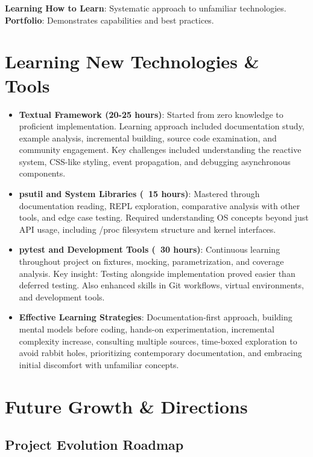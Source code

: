 \documentclass[12pt,a4paper,oneside]{report}
\begin{document}
\textbf{Learning How to Learn}: Systematic approach to unfamiliar technologies. \textbf{Portfolio}: Demonstrates capabilities and best practices.

\section{Learning New Technologies \& Tools}
\label{sec:learning-technologies}

\begin{itemize}
    \item \textbf{Textual Framework (20-25 hours)}: Started from zero knowledge to proficient implementation. Learning approach included documentation study, example analysis, incremental building, source code examination, and community engagement. Key challenges included understanding the reactive system, CSS-like styling, event propagation, and debugging asynchronous components.
    
    \item \textbf{psutil and System Libraries (~15 hours)}: Mastered through documentation reading, REPL exploration, comparative analysis with other tools, and edge case testing. Required understanding OS concepts beyond just API usage, including /proc filesystem structure and kernel interfaces.
    
    \item \textbf{pytest and Development Tools (~30 hours)}: Continuous learning throughout project on fixtures, mocking, parametrization, and coverage analysis. Key insight: Testing alongside implementation proved easier than deferred testing. Also enhanced skills in Git workflows, virtual environments, and development tools.
    
    \item \textbf{Effective Learning Strategies}: Documentation-first approach, building mental models before coding, hands-on experimentation, incremental complexity increase, consulting multiple sources, time-boxed exploration to avoid rabbit holes, prioritizing contemporary documentation, and embracing initial discomfort with unfamiliar concepts.
\end{itemize}

\section{Future Growth \& Directions}
\label{sec:future-growth}

\subsection{Project Evolution Roadmap}
\end{document}
